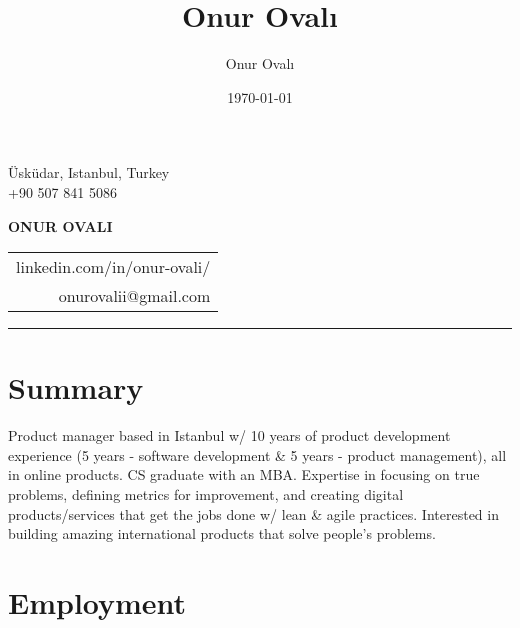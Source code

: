 \documentclass[11pt,twoside,a4paper]{article}
\title{Onur Ovalı}
\author{Onur Ovalı}
\date{\today}
\makeatletter
\newcommand\textbox[1]{%
  \parbox{.333\textwidth}{#1} %
}
\renewcommand\maketitle
{\noindent
 {\textbf{Üsküdar, Istanbul, Turkey}}%
 \medskip\par\noindent
 {\textbf{linkedin.com/in/onur-ovali}}%
 \hfill
 {\large\@date}%
 \bigskip\par\noindent
}
\makeatother
\begin{document}


  \noindent\textbox{Üsküdar, Istanbul, Turkey \\+90 507 841 5086\hfill}
  \textbox{\hfil\Large\bfseries ONUR OVALI\hfil}
  \textbox
    {\hfill \begin{tabular}[c]{r}
      linkedin.com/in/onur-ovali/ \\
      onurovalii@gmail.com
    \end{tabular}
    }

  \hrule

  \section{Summary}
    Product manager based in Istanbul w/ 10 years of product development experience (5 years - software development \& 5 years - product management), all in online products. CS graduate with an MBA. Expertise in focusing on true problems, defining metrics for improvement, and creating digital products/services that get the jobs done w/ lean \& agile practices. Interested in building amazing international products that solve people's problems.

  \section{Employment}
\end{document}
